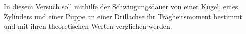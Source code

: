 In diesem Versuch soll mithilfe der Schwingungsdauer von einer Kugel, eines Zylinders und einer Puppe 
an einer Drillachse ihr Trägheitsmoment bestimmt und mit ihren theoretischen Werten verglichen
werden.